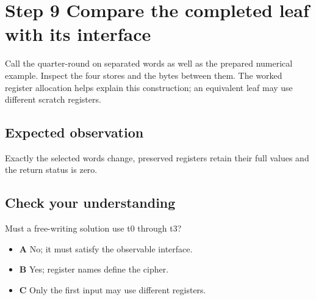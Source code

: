 \section{Step 9 Compare the completed leaf with its interface}\label{chacha-s09}

Call the quarter-round on separated words as well as the prepared numerical example. Inspect the four stores and the bytes between them. The worked register allocation helps explain this construction; an equivalent leaf may use different scratch registers.

\subsection{Expected observation}
Exactly the selected words change, preserved registers retain their full values and the return status is zero.

\subsection{Check your understanding}
Must a free-writing solution use t0 through t3?

\begin{itemize}
  \item \textbf{A} No; it must satisfy the observable interface.
  \item \textbf{B} Yes; register names define the cipher.
  \item \textbf{C} Only the first input may use different registers.
\end{itemize}
